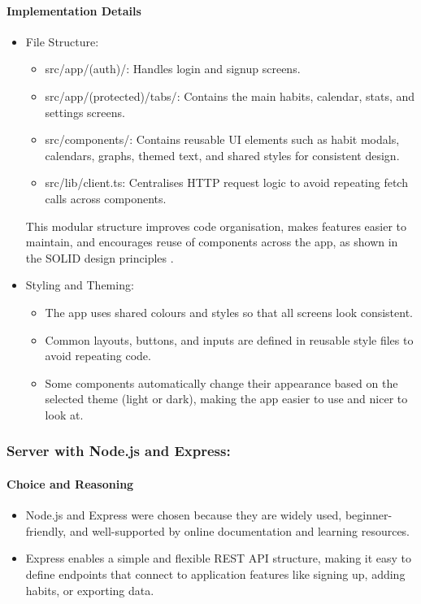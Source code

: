 \paragraph{Implementation Details} \begin{itemize} \item {File Structure}:
\begin{itemize} \item {src/app/(auth)/}: Handles login and signup screens.
\item{src/app/(protected)/tabs/}: Contains the main habits, calendar, stats, and settings screens.
\item{src/components/}: Contains reusable UI elements such as habit modals, calendars, graphs, themed text, and shared styles for consistent design.
\item {src/lib/client.ts}: Centralises HTTP request logic to avoid repeating fetch calls across components. \end{itemize} 
This modular structure improves code organisation, makes features easier to maintain, and encourages reuse of components across the app, as shown in the SOLID design principles \cite{martin2002solid}.

\item {Styling and Theming}:
\begin{itemize} 
\item The app uses shared colours and styles so that all screens look consistent.
\item Common layouts, buttons, and inputs are defined in reusable style files to avoid repeating code.
\item Some components automatically change their appearance based on the selected theme (light or dark), making the app easier to use and nicer to look at. \end{itemize} \end{itemize}


\subsubsection{Server with Node.js and Express:}

\paragraph{Choice and Reasoning}
\begin{itemize}
\item Node.js and Express were chosen because they are widely used, beginner-friendly, and well-supported by online documentation and learning resources.
\item Express enables a simple and flexible REST API structure, making it easy to define endpoints that connect to application features like signing up, adding habits, or exporting data.
\end{itemize}

